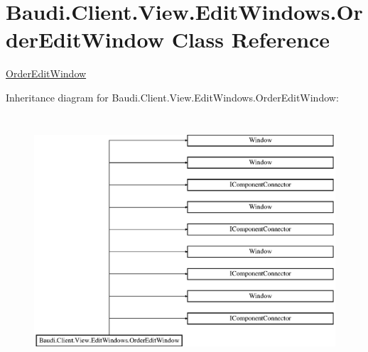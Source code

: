 \hypertarget{class_baudi_1_1_client_1_1_view_1_1_edit_windows_1_1_order_edit_window}{}\section{Baudi.\+Client.\+View.\+Edit\+Windows.\+Order\+Edit\+Window Class Reference}
\label{class_baudi_1_1_client_1_1_view_1_1_edit_windows_1_1_order_edit_window}


\hyperlink{class_baudi_1_1_client_1_1_view_1_1_edit_windows_1_1_order_edit_window}{Order\+Edit\+Window}  


Inheritance diagram for Baudi.\+Client.\+View.\+Edit\+Windows.\+Order\+Edit\+Window\+:\begin{figure}[H]
\begin{center}
\leavevmode
\includegraphics[height=9.395973cm]{class_baudi_1_1_client_1_1_view_1_1_edit_windows_1_1_order_edit_window}
\end{center}
\end{figure}
